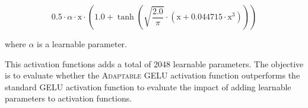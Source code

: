 \[
    0.5 \cdot \alpha \cdot \text{x} \cdot \left( 1.0 + \tanh \left( \sqrt{\frac{2.0}{\pi}} \cdot (\text{x} + 0.044715 \cdot \text{x}^3) \right) \right)
\]

where \(\alpha\) is a learnable parameter. 

This activation functions adds a total of 2048 learnable parameters. The objective is to evaluate whether the \textsc{Adaptable GELU} activation function outperforms the standard \textsc{GELU} activation function to evaluate the impact of adding learnable parameters to activation functions.






